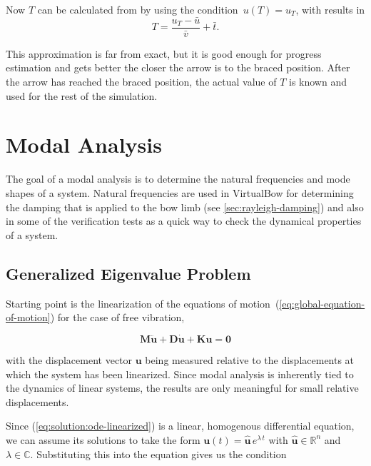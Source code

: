 Now $T$ can be calculated from by using the condition~$u(T) = u_T$, with results in
\begin{equation}
T = \frac{u_T - \bar{u}}{\bar{v}} + \bar{t}.
\end{equation}

This approximation is far from exact, but it is good enough for progress estimation and gets better the closer the arrow is to the braced position.
After the arrow has reached the braced position, the actual value of $T$ is known and used for the rest of the simulation.

\newpage
\section{Modal Analysis}

The goal of a modal analysis is to determine the natural frequencies and mode shapes of a system.
Natural frequencies are used in VirtualBow for determining the damping that is applied to the bow limb (see \ref{sec:rayleigh-damping}) and also in some of the verification tests as a quick way to check the dynamical properties of a system.

\subsection{Generalized Eigenvalue Problem}

Starting point is the linearization of the equations of motion~(\ref{eq:global-equation-of-motion}) for the case of free vibration,

\begin{equation}
\boldsymbol{M}\ddot{\boldsymbol{u}} + \boldsymbol{D}\dot{\boldsymbol{u}} + \boldsymbol{K}\boldsymbol{u} = \boldsymbol{0} \label{eq:solution:ode-linearized}
\end{equation}

with the displacement vector $\boldsymbol{u}$ being measured relative to the displacements at which the system has been linearized.
Since modal analysis is inherently tied to the dynamics of linear systems, the results are only meaningful for small relative displacements.

Since (\ref{eq:solution:ode-linearized}) is a linear, homogenous differential equation, we can assume its solutions to take the form $\boldsymbol{u}(t) = \hat{\boldsymbol{u}}\,e^{\lambda\,t}$ with $\hat{\boldsymbol{u}} \in \mathbb{R}^n$ and $\lambda \in \mathbb{C}$. Substituting this into the equation gives us the condition

